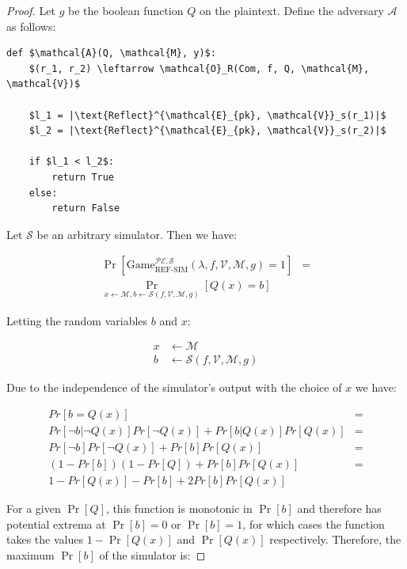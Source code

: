 \documentclass{sig-alternate-05-2015}
\begin{document}
\begin{proof}

Let $g$ be the boolean function $Q$ on the plaintext. Define the adversary
$\mathcal{A}$ as follows:

\begin{lstlisting}[texcl,mathescape]
def $\mathcal{A}(Q, \mathcal{M}, y)$:
    $(r_1, r_2) \leftarrow \mathcal{O}_R(Com, f, Q, \mathcal{M}, \mathcal{V})$

    $l_1 = |\text{Reflect}^{\mathcal{E}_{pk}, \mathcal{V}}_s(r_1)|$
    $l_2 = |\text{Reflect}^{\mathcal{E}_{pk}, \mathcal{V}}_s(r_2)|$

    if $l_1 < l_2$:
        return True
    else:
        return False
\end{lstlisting}

Let $\mathcal{S}$ be an arbitrary simulator. Then we have:

\begin{align*}
    \Pr[\text{Game}_{\text{REF-SIM}}^{\mathcal{PE},\mathcal{S}}
        (\lambda, f, \mathcal{V}, \mathcal{M}, g) = 1] &=\\
    \Pr_{x \leftarrow \mathcal{M}, b \leftarrow \mathcal{S}(f, \mathcal{V}, \mathcal{M}, g)}
        [Q(x) = b]
\end{align*}

Letting the random variables $b$ and $x$:

\begin{align*}
    x &\leftarrow \mathcal{M}\\
    b &\leftarrow \mathcal{S}(f, \mathcal{V}, \mathcal{M}, g)
\end{align*}

Due to the independence of the simulator's output with the choice of $x$ we have:

\begin{align*}
    Pr[b = Q(x)] &=\\
    Pr[\lnot b|\lnot Q(x)]Pr[\lnot Q(x)] + Pr[b|Q(x)]Pr[Q(x)] &=\\
    Pr[\lnot b]Pr[\lnot Q(x)] + Pr[b]Pr[Q(x)] &=\\
    (1 - Pr[b])(1 - Pr[Q]) + Pr[b]Pr[Q(x)] &=\\
    1 - Pr[Q(x)] - Pr[b] + 2Pr[b]Pr[Q(x)]
\end{align*}

For a given $\Pr[Q]$, this function is monotonic in $\Pr[b]$ and therefore has
potential extrema at $\Pr[b] = 0$ or $\Pr[b] = 1$, for which cases the function
takes the values $1 - \Pr[Q(x)]$ and $\Pr[Q(x)]$ respectively. Therefore, the
maximum $\Pr[b]$ of the simulator is:


\end{proof}
\end{document}
